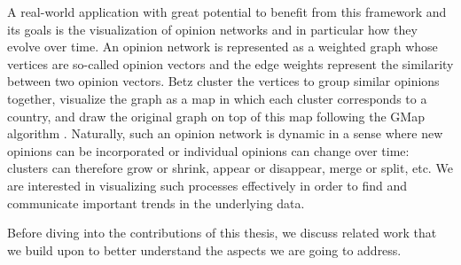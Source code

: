 A real-world application with great potential to benefit from this framework and its goals is the visualization of opinion networks \cite{betz2019applying} and in particular how they evolve over time.
An opinion network is represented as a weighted graph whose vertices are so-called opinion vectors and the edge weights represent the similarity between two opinion vectors.
Betz \etal{} \cite{betz2019applying} cluster the vertices to group similar opinions together, visualize the graph as a map in which each cluster corresponds to a country, and draw the original graph on top of this map following the GMap algorithm \cite{gansner2009gmap}.
Naturally, such an opinion network is dynamic in a sense where new opinions can be incorporated or individual opinions can change over time: clusters can therefore grow or shrink, appear or disappear, merge or split, etc.
We are interested in visualizing such processes effectively in order to find and communicate important trends in the underlying data.

Before diving into the contributions of this thesis, we discuss related work that we build upon to better understand the aspects we are going to address.
